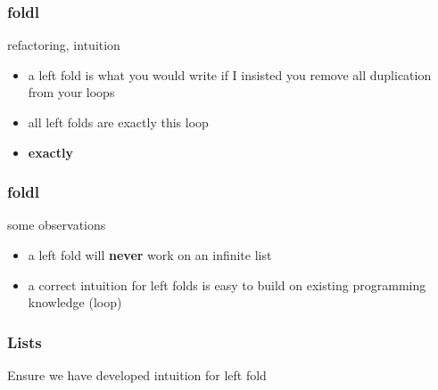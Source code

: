 \begin{frame}
\frametitle{foldl}
\begin{block}{refactoring, intuition}
\begin{itemize}
\item<1-> a left fold is what you would write if I insisted you remove all duplication from your loops
\item<2-> all left folds are exactly this loop
\item<3-> \textbf{exactly}
\end{itemize}
\end{block}
\end{frame}

\begin{frame}
\frametitle{foldl}
\begin{block}{some observations}
\begin{itemize}
\item<1-> a left fold will \textbf{never} work on an infinite list
\item<2-> a correct intuition for left folds is easy to build on existing programming knowledge (loop)
\end{itemize}
\end{block}
\end{frame}

\begin{frame}
\frametitle{Lists}
\begin{center}
Ensure we have developed intuition for left fold
\end{center}
\end{frame}
